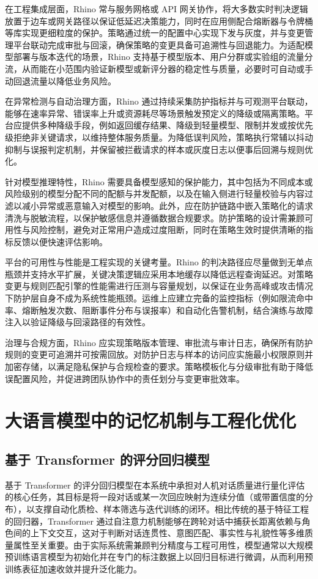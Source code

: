 在工程集成层面，Rhino 常与服务网格或 API 网关协作，将大多数实时判决逻辑放置于边车或网关路径以保证低延迟决策能力，同时在应用侧配合熔断器与令牌桶等库实现更细粒度的保护。策略通过统一的配置中心实现下发与灰度，并与变更管理平台联动完成审批与回滚，确保策略的变更具备可追溯性与回退能力。为适配模型部署与版本迭代的场景，Rhino 支持基于模型版本、用户分群或实验组的流量分流，从而能在小范围内验证新模型或新评分器的稳定性与质量，必要时可自动或手动回退流量以降低业务风险。

在异常检测与自动治理方面，Rhino 通过持续采集防护指标并与可观测平台联动，能够在速率异常、错误率上升或资源耗尽等场景触发预定义的降级或隔离策略。平台应提供多种降级手段，例如返回缓存结果、降级到轻量模型、限制并发或按优先级拒绝非关键请求，以维持整体服务质量。为降低误判风险，策略执行常辅以抖动抑制与误报判定机制，并保留被拦截请求的样本或灰度日志以便事后回溯与规则优化。

针对模型推理特性，Rhino 需要具备模型感知的保护能力，其中包括为不同成本或风险级别的模型分配不同的配额与并发配额，以及在输入侧进行轻量校验与内容过滤以减小异常或恶意输入对模型的影响。此外，应在防护链路中嵌入策略化的请求清洗与脱敏流程，以保护敏感信息并遵循数据合规要求。防护策略的设计需兼顾可用性与风险控制，避免对正常用户造成过度阻断，同时在策略生效时提供清晰的指标反馈以便快速评估影响。

平台的可用性与性能是工程实现的关键考量。Rhino 的判决路径应尽量做到无单点瓶颈并支持水平扩展，关键决策逻辑应采用本地缓存以降低远程查询延迟。对策略变更与规则匹配引擎的性能需进行压测与容量规划，以保证在业务高峰或攻击情况下防护层自身不成为系统性能瓶颈。运维上应建立完备的监控指标（例如限流命中率、熔断触发次数、阻断事件分布与误报率）和自动化告警机制，结合演练与故障注入以验证降级与回滚路径的有效性。

治理与合规方面，Rhino 应实现策略版本管理、审批流与审计日志，确保所有防护规则的变更可追溯并可按需回放。对防护日志与样本的访问应实施最小权限原则并加密存储，以满足隐私保护与合规检查的要求。策略模板化与分级审批有助于降低误配置风险，并促进跨团队协作中的责任划分与变更审批效率。
\section{大语言模型中的记忆机制与工程化优化}
\subsection{基于 Transformer 的评分回归模型}
基于 Transformer 的评分回归模型在本系统中承担对人机对话质量进行量化评估的核心任务，其目标是将一段对话或某一次回应映射为连续分值（或带置信度的分布），以支撑自动化质检、样本筛选与迭代训练的闭环。相比传统的基于特征工程的回归器，Transformer 通过自注意力机制能够在跨轮对话中捕获长距离依赖与角色间的上下文交互\cite{10056996}，这对于判断对话连贯性、意图匹配、事实性与礼貌性等多维质量属性至关重要。由于实际系统需兼顾判分精度与工程可用性，模型通常以大规模预训练语言模型为初始化并在专门的标注数据上以回归目标进行微调，从而利用预训练表征加速收敛并提升泛化能力。

